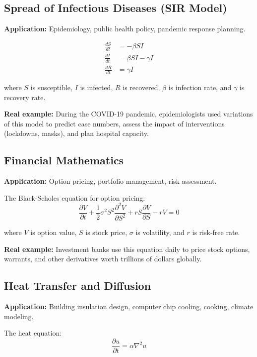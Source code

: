 \documentclass{article}
\begin{document}
\subsection{Spread of Infectious Diseases (SIR Model)}

\textbf{Application:} Epidemiology, public health policy, pandemic response planning.

\begin{align}
\frac{dS}{dt} &= -\beta SI\\
\frac{dI}{dt} &= \beta SI - \gamma I\\
\frac{dR}{dt} &= \gamma I
\end{align}

where $S$ is susceptible, $I$ is infected, $R$ is recovered, $\beta$ is infection rate, and $\gamma$ is recovery rate.

\textbf{Real example:} During the COVID-19 pandemic, epidemiologists used variations of this model to predict case numbers, assess the impact of interventions (lockdowns, masks), and plan hospital capacity.

\subsection{Financial Mathematics}

\textbf{Application:} Option pricing, portfolio management, risk assessment.

The Black-Scholes equation for option pricing:
\begin{equation}
\frac{\partial V}{\partial t} + \frac{1}{2}\sigma^2 S^2 \frac{\partial^2 V}{\partial S^2} + rS\frac{\partial V}{\partial S} - rV = 0
\end{equation}

where $V$ is option value, $S$ is stock price, $\sigma$ is volatility, and $r$ is risk-free rate.

\textbf{Real example:} Investment banks use this equation daily to price stock options, warrants, and other derivatives worth trillions of dollars globally.

\subsection{Heat Transfer and Diffusion}

\textbf{Application:} Building insulation design, computer chip cooling, cooking, climate modeling.

The heat equation:
\begin{equation}
\frac{\partial u}{\partial t} = \alpha \nabla^2 u
\end{equation}
\end{document}
